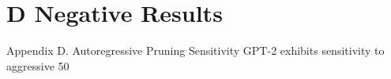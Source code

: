 \section{D Negative Results}

 Appendix D. Autoregressive Pruning Sensitivity
GPT-2 exhibits sensitivity to aggressive 50%
